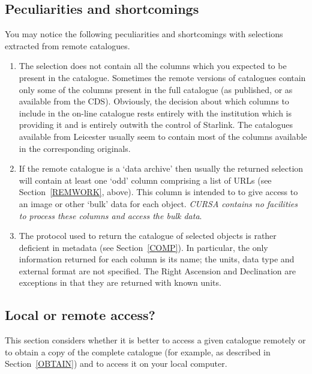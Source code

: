 \documentclass[twoside,11pt]{starlink}
\begin{document}
\subsection{Peculiarities and shortcomings  \label{REMPEC} }

You may notice the following peculiarities and shortcomings with
selections extracted from remote catalogues.

\begin{enumerate}

  \item The selection does not contain all the columns which you
   expected to be present in the catalogue.  Sometimes the remote
   versions of catalogues contain only some of the columns present
   in the full catalogue (as published, or as available from the CDS).
   Obviously, the decision about which columns to include in the
   on-line catalogue rests entirely with the institution which is
   providing it and is entirely outwith the control of Starlink.
   The catalogues available from Leicester usually seem to contain
   most of the columns available in the corresponding originals.

  \item If the remote catalogue is a `data archive' then usually the
   returned selection will contain at least one `odd' column comprising a
   list of URLs (see Section~\ref{REMWORK}, above).  This column is
   intended to to give access to an image or other `bulk' data for each
   object.  \textit{CURSA contains no facilities to process these columns
   and access the bulk data}.

  \item The protocol used to return the catalogue of selected objects
   is rather deficient in metadata (see Section~\ref{COMP}).  In particular,
   the only information returned for each column is its name; the units,
   data type and external format are not specified.  The Right Ascension
   and Declination are exceptions in that they are returned with known
   units.

\end{enumerate}

\subsection{Local or remote access?}

This section considers whether it is better to access a given catalogue
remotely or to obtain a copy of the complete catalogue (for example,
as described in Section~\ref{OBTAIN}) and to access it on your local
computer.
\end{document}
